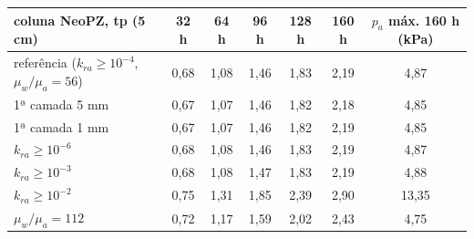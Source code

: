 \begin{tabular}{l|ccccc|c}
\toprule
coluna NeoPZ, tp (5 cm) & 32 h & 64 h & 96 h & 128 h & 160 h & $p_a$ máx. 160 h (kPa)\\
\midrule
referência ($k_{ra} \geq 10^{-4}$, $\mu_w/\mu_a = 56$) & 0{,}68 & 1{,}08 & 1{,}46 & 1{,}83 & 2{,}19 & 4{,}87\\
1ª camada 5 mm & 0{,}67 & 1{,}07 & 1{,}46 & 1{,}82 & 2{,}18 & 4{,}85\\
1ª camada 1 mm & 0{,}67 & 1{,}07 & 1{,}46 & 1{,}82 & 2{,}19 & 4{,}85\\
$k_{ra} \geq 10^{-6}$ & 0{,}68 & 1{,}08 & 1{,}46 & 1{,}83 & 2{,}19 & 4{,}87\\
$k_{ra} \geq 10^{-3}$ & 0{,}68 & 1{,}08 & 1{,}47 & 1{,}83 & 2{,}19 & 4{,}88\\
$k_{ra} \geq 10^{-2}$ & 0{,}75 & 1{,}31 & 1{,}85 & 2{,}39 & 2{,}90 & 13{,}35\\
$\mu_w/\mu_a = 112$ & 0{,}72 & 1{,}17 & 1{,}59 & 2{,}02 & 2{,}43 & 4{,}75\\
\bottomrule
\end{tabular}
